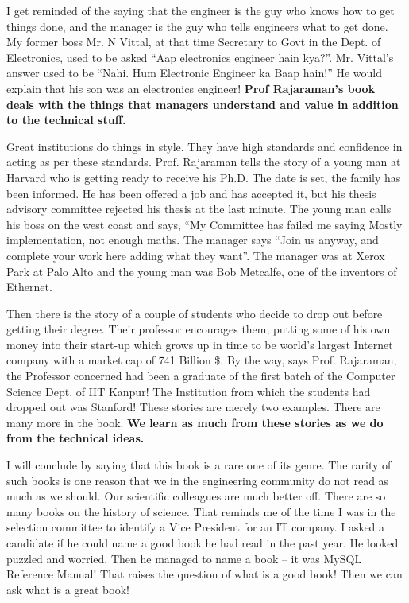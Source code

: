 \begin{multicols}{2}
I get reminded of the saying that the engineer is the guy who knows how to get things done, and the manager is the guy who tells engineers what to get done. My former boss Mr. N Vittal, at that time Secretary to Govt in the Dept. of Electronics, used to be asked “Aap electronics engineer hain kya?”. Mr. Vittal’s answer used to be “Nahi. Hum Electronic Engineer ka Baap hain!” He would explain that his son was an electronics engineer! \textbf{Prof Rajaraman’s book deals with the things that managers understand and value in addition to the technical stuff.}

Great institutions do things in style. They have high standards and confidence in acting as per these standards. Prof. Rajaraman tells the story of a young man at Harvard who is getting ready to receive his Ph.D. The date is set, the family has been informed. He has been offered a job and has accepted it, but his thesis advisory committee rejected his thesis at the last minute. The young man calls his boss on the west coast and says, “My Committee has failed me saying Mostly implementation, not enough maths. The manager says “Join us anyway, and complete your work here adding what they want”. The manager was at Xerox Park at Palo Alto and the young man was Bob Metcalfe, one of the inventors of Ethernet.

Then there is the story of a couple of students who decide to drop out before getting their degree. Their professor encourages them, putting some of his own money into their start-up which grows up in time to be world’s largest Internet company with a market cap of 741 Billion \$. By the way, says Prof. Rajaraman, the Professor concerned had been a graduate of the first batch of the Computer Science Dept. of IIT Kanpur! The Institution from which the students had dropped out was Stanford!  These stories are merely two examples. There are many more in the book. \textbf{We learn as much from these stories as we do from the technical ideas.}

I will conclude by saying that this book is a rare one of its genre. The rarity of such books is one reason that we in the engineering community do not read as much as we should. Our scientific colleagues are much better off. There are so many books on the history of science.  That reminds me of the time I was in the selection committee to identify a Vice President for an IT company. I asked a candidate if he could name a good book he had read in the past year. He looked puzzled and worried. Then he managed to name a book – it was MySQL Reference Manual! That raises the question of what is a good book! Then we can ask what is a great book!


\end{multicols}
